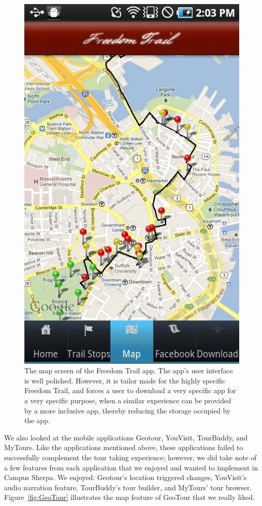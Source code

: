 \documentclass{sigchi}
\begin{document}
\begin{figure}[h]
\centering
\includegraphics[width=1.0\linewidth]{./FreedomTrail}
\caption{The map screen of the Freedom Trail app. The app's user interface is well polished. However, it is tailor made for the highly specific Freedom Trail, and forces a user to download a very specific app for a very specific purpose, when a similar experience can be provided by a more inclusive app, thereby reducing the storage occupied by the app. }
\label{fig:FreedomTrail}
\end{figure}

We also looked at the mobile applications Geotour, YouVisit, TourBuddy, and MyTours. Like the applications mentioned above, these applications failed to successfully complement the tour taking experience; however, we did take note of a few features from each application that we enjoyed and wanted to implement in Campus Sherpa. We enjoyed: Geotour's location triggered changes, YouVisit's audio narration feature, TourBuddy's tour builder, and MyTours' tour browser. Figure~\ref{fig:GeoTour} illustrates the map feature of GeoTour that we really liked.
\end{document}
